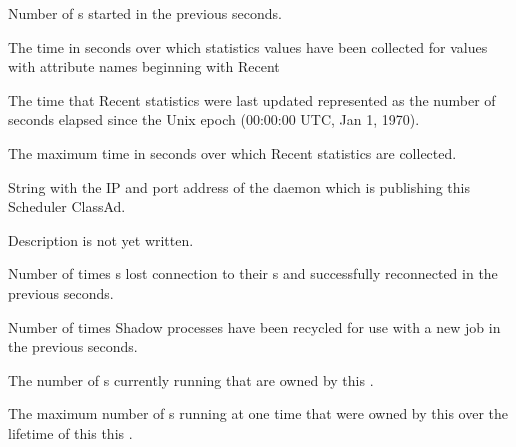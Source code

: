 \begin{description}
\item[\AdAttr{RecentShadowsStarted}:] Number of s started
  in the previous  seconds.

\item[\AdAttr{RecentStatsLifetime}:] The time in seconds over which statistics values have been collected 
  for values with attribute names beginning with Recent

\item[\AdAttr{RecentStatsTickTime}:] The time that Recent statistics were last updated
  represented as the number of seconds elapsed since
    the Unix epoch (00:00:00 UTC, Jan 1, 1970).

\item[\AdAttr{RecentWindowMax}:] The maximum time in seconds over which Recent statistics are collected.

\item[\AdAttr{ScheddIpAddr}:] String with the IP and port address of the
 daemon which is publishing this Scheduler ClassAd.

\item[\AdAttr{ServerTime}:] Description is not yet written.

\item[\AdAttr{ShadowsReconnections}:] Number of times s lost 
  connection to their s and successfully reconnected
  in the previous  seconds.

\item[\AdAttr{ShadowsRecycled}:] Number of times Shadow processes have been 
  recycled for use with a new job
  in the previous  seconds.

\item[\AdAttr{ShadowsRunning}:] The number of s currently running 
  that are owned by this .

\item[\AdAttr{ShadowsRunningPeak}:] The maximum number of s running at one time
  that were owned by this  over the lifetime of this this .


\end{description}
